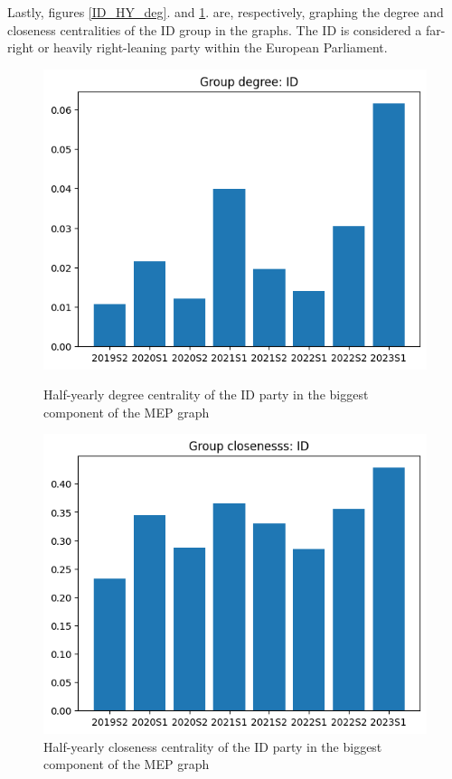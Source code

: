 \documentclass[lettersize,journal]{IEEEtran}
\begin{document}
Lastly, figures \ref{ID_HY_deg}. and \ref{ID_HY_cls}. are, respectively, graphing the degree and closeness centralities of the ID group in the graphs. The ID is considered a far-right or heavily right-leaning party within the European Parliament.

\begin{figure}[h]
  \centering
  \begin{minipage}[b]{0.23\textwidth}
    \includegraphics[width=\textwidth]{ID_HY_deg.png}
    \caption{Half-yearly degree centrality of the ID party in the biggest component of the MEP graph}
    \label{ID_HY_deg}
  \end{minipage}
  \hfill
  \begin{minipage}[b]{0.23\textwidth}
    \includegraphics[width=\textwidth]{ID_HY_cls.png}
    \caption{Half-yearly closeness centrality of the ID party in the  biggest component of the MEP graph}
    \label{ID_HY_cls}
  \end{minipage}
\end{figure}
\end{document}
